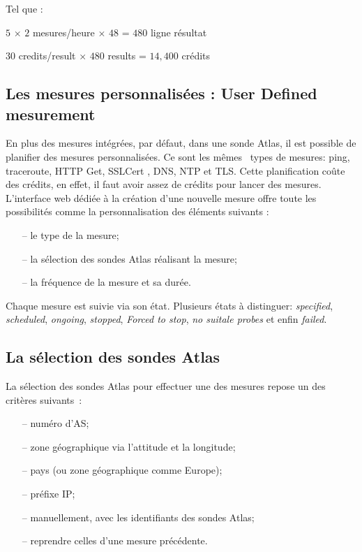 Tel que :

\begin{tcolorbox}
	\begin{center}
		$5$ $\times$ $2$ mesures/heure $\times$ $48$ = $480$ ligne résultat
		
		$30$ credits/result $\times$ $480$ results = $14,400$ crédits
	\end{center}
\end{tcolorbox}	

\subsection{Les mesures personnalisées : User Defined mesurement} \label{par:udm}

En plus des mesures intégrées, par défaut, dans une sonde Atlas, il est possible de planifier des mesures personnalisées. Ce sont les m\^{e}mes~  types de mesures: ping, traceroute,  HTTP Get, SSLCert , DNS, NTP et TLS. Cette planification coûte des crédits, en effet, il faut avoir assez de crédits pour lancer des mesures. L'interface web dédiée à la création d'une nouvelle mesure offre toute les possibilités comme la personnalisation des éléments suivants :
\begin{itemize}
	\item[--] le type de la mesure;
	\item[--] la sélection des sondes Atlas réalisant la mesure;
	\item[--] la fréquence de la mesure et sa durée.
\end{itemize}

Chaque mesure est suivie via son état. Plusieurs états à distinguer: \textit{specified}, \textit{scheduled}, \textit{ongoing}, \textit{stopped},  \textit{Forced to stop},  \textit{no suitale probes} et enfin  \textit{failed}.



\subsection{La sélection des sondes Atlas}

La sélection des sondes  Atlas pour effectuer une des mesures repose un des critères suivants~: 
\begin{itemize}
	\item[--] numéro d'AS;
	\item[--] zone géographique via  l'attitude et la longitude;
	\item[--] pays (ou zone géographique comme  Europe);
	\item[--] préfixe IP; %
	\item[--] manuellement, avec les identifiants des sondes Atlas;
	\item[--] reprendre celles d'une  mesure précédente.
\end{itemize}

